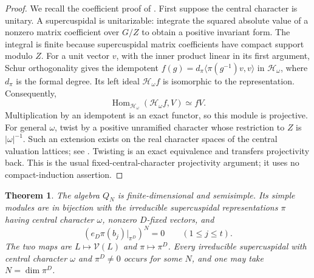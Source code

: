 \documentclass[10pt,letterpaper]{amsart}
\numberwithin{equation}{section}
\newtheorem{theorem}{Theorem}[section]
\theoremstyle{remark}
\newcommand{\Hom}{\operatorname{Hom}}
\begin{document}
\begin{proof}
We recall the coefficient proof of \cite[Theorem~5.4.1]{Casselman}.
First suppose the central character is unitary. A supercuspidal is
unitarizable: integrate the squared absolute value of a nonzero matrix
coefficient over $G/Z$ to obtain a positive invariant form. The integral
is finite because supercuspidal matrix coefficients have compact support
modulo $Z$. For a unit vector $v$, with the inner product linear in its first argument,
Schur orthogonality gives the idempotent
$f(g)=d_\pi\langle\pi(g^{-1})v,v\rangle$ in $\mathcal H_\omega$, where
$d_\pi$ is the formal degree. Its left ideal $\mathcal H_\omega f$ is
isomorphic to the representation. Consequently,
\[
 \Hom_{\mathcal H_\omega}(\mathcal H_\omega f,V)\simeq fV.
\]
Multiplication by an idempotent is an exact functor, so this module is
projective. For general $\omega$, twist by a positive unramified character
whose restriction to $Z$ is $|\omega|^{-1}$. Such an extension exists on
the real character spaces of the central valuation lattices; see
\cite[Lemma~5.2.5]{Casselman}. Twisting
is an exact equivalence and transfers projectivity back. This is the
usual fixed-central-character projectivity argument; it uses no
compact-induction assertion.
\end{proof}

\begin{theorem}\label{thm:nilpotent-hecke-classification}
The algebra $Q_N$ is finite-dimensional and semisimple. Its simple modules
are in bijection with the irreducible supercuspidal representations $\pi$
having central character $\omega$, nonzero $D$-fixed vectors, and
\[
 (e_D\pi(b_j)|_{\pi^D})^N=0\qquad(1\le j\le t).
\]
The two maps are $L\mapsto\mathcal V(L)$ and $\pi\mapsto\pi^D$.
Every irreducible supercuspidal with central character $\omega$ and
$\pi^D\ne0$ occurs for some $N$, and one may take $N=\dim\pi^D$.
\end{theorem}
\end{document}
